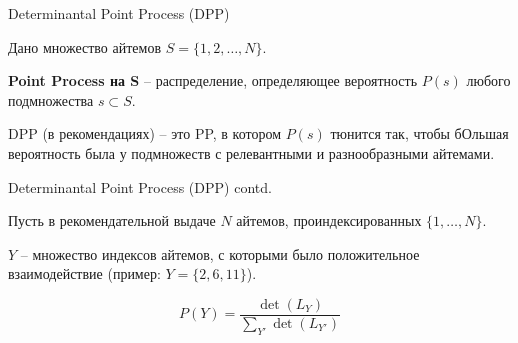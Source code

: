 \documentclass[11pt,aspectratio=169,handout]{beamer}
\begin{document}
\begin{frame}{Determinantal Point Process (DPP) \cite{DDP}}

Дано множество айтемов $S = \{1, 2, \ldots, N\}$.

\vfill

{\bf Point Process на S} -- распределение, определяющее вероятность $P(s)$ любого подмножества $s \subset S$.

\vfill

DPP (в рекомендациях) – это PP, в котором $P(s)$ тюнится так, чтобы бОльшая вероятность была у подмножеств с релевантными и разнообразными айтемами.

\end{frame}

\begin{frame}{Determinantal Point Process (DPP) contd.}

Пусть в рекомендательной выдаче $N$ айтемов, проиндексированных $\{1,\ldots, N\}$.

\vfill

$Y$ – множество индексов айтемов, с которыми было положительное взаимодействие (пример: $Y = \{2, 6, 11\}$).

\[
P(Y) = \frac{\det(L_Y)}{\sum_{Y'} \det(L_{Y'})}
\]

\end{frame}
\end{document}
